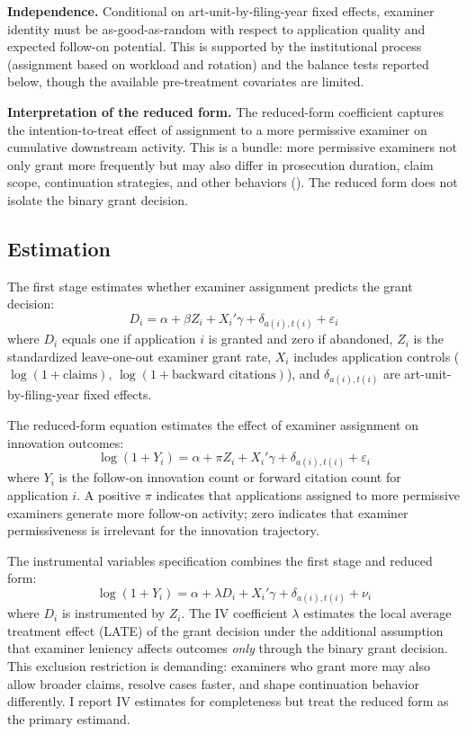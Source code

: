 \documentclass[12pt]{article}
\begin{document}
\textbf{Independence.} Conditional on art-unit-by-filing-year fixed effects, examiner identity must be as-good-as-random with respect to application quality and expected follow-on potential. This is supported by the institutional process (assignment based on workload and rotation) and the balance tests reported below, though the available pre-treatment covariates are limited.

\textbf{Interpretation of the reduced form.} The reduced-form coefficient captures the intention-to-treat effect of assignment to a more permissive examiner on cumulative downstream activity. This is a bundle: more permissive examiners not only grant more frequently but may also differ in prosecution duration, claim scope, continuation strategies, and other behaviors (\citealt{frakes2017}). The reduced form does not isolate the binary grant decision.

\subsection{Estimation}

The first stage estimates whether examiner assignment predicts the grant decision:
\begin{equation}
D_{i} = \alpha + \beta Z_{i} + X_{i}'\gamma + \delta_{a(i),t(i)} + \varepsilon_{i}
\label{eq:firststage}
\end{equation}
where $D_i$ equals one if application $i$ is granted and zero if abandoned, $Z_i$ is the standardized leave-one-out examiner grant rate, $X_i$ includes application controls ($\log(1 + \text{claims})$, $\log(1 + \text{backward citations})$), and $\delta_{a(i),t(i)}$ are art-unit-by-filing-year fixed effects.

The reduced-form equation estimates the effect of examiner assignment on innovation outcomes:
\begin{equation}
\log(1 + Y_{i}) = \alpha + \pi Z_{i} + X_{i}'\gamma + \delta_{a(i),t(i)} + \varepsilon_{i}
\label{eq:reducedform}
\end{equation}
where $Y_i$ is the follow-on innovation count or forward citation count for application $i$. A positive $\pi$ indicates that applications assigned to more permissive examiners generate more follow-on activity; zero indicates that examiner permissiveness is irrelevant for the innovation trajectory.

The instrumental variables specification combines the first stage and reduced form:
\begin{equation}
\log(1 + Y_{i}) = \alpha + \lambda D_{i} + X_{i}'\gamma + \delta_{a(i),t(i)} + \nu_{i}
\label{eq:iv}
\end{equation}
where $D_i$ is instrumented by $Z_i$. The IV coefficient $\lambda$ estimates the local average treatment effect (LATE) of the grant decision under the additional assumption that examiner leniency affects outcomes \emph{only} through the binary grant decision. This exclusion restriction is demanding: examiners who grant more may also allow broader claims, resolve cases faster, and shape continuation behavior differently. I report IV estimates for completeness but treat the reduced form as the primary estimand.
\end{document}
